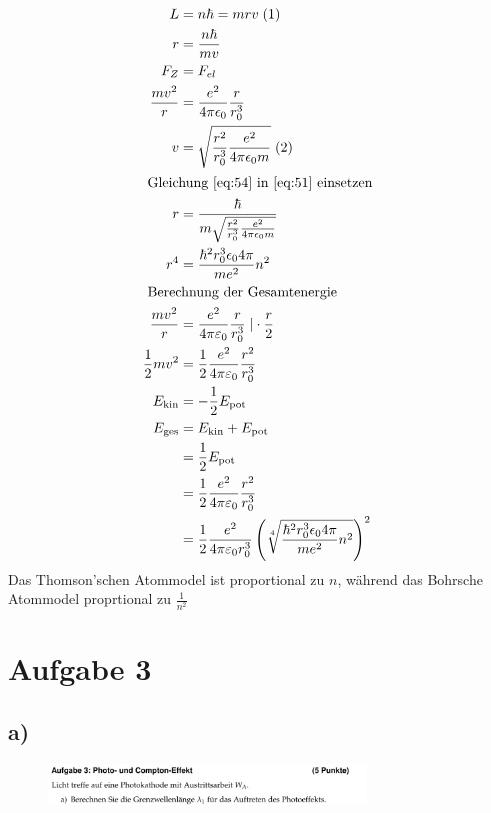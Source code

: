 \begin{align}
    L &= n \hbar = mrv \;(1)\\
    r &= \frac{n \hbar}{mv} \label{eq:51} \\
    F_Z &= F_{el}\\
    \frac{mv^2}{r} &= \frac{e^2}{4 \pi \epsilon _0} \frac{r}{r_0^3}\\
    v &= \sqrt{\frac{r^2}{r_0^3}\frac{e^2}{4 \pi \epsilon _0 m}} \;(2) \label{eq:54}\\
    \intertext{
        Gleichung \eqref{eq:54} in \eqref{eq:51} einsetzen
    }
    r &= \frac{\hbar}{m \sqrt{\frac{r^2}{r_0^3}\frac{e^2}{4 \pi \epsilon _0 m}}}\\
    r^4 &= \frac{\hbar ^2 r_0^3 \epsilon _0 4 \pi}{m e^2} n^2\\
    \intertext{
        Berechnung der Gesamtenergie
        }
    \frac{m v^2}{r} &= \frac{e^2}{4 \pi \varepsilon _0}\frac{r}{r_0^3}\;\vert \cdot \frac{r}{2}\\
    \frac{1}{2} m v^2 &= \frac{1}{2} \frac{e^2}{4 \pi \varepsilon _0} \frac{r^2}{r_0^3}\\
    E_{\text{kin}}&=-\frac{1}{2} E_{\text{pot}}\\
    E_{\text{ges}} &= E_{\text{kin}}+E_{\text{pot}}\\
    &=  \frac{1}{2} E_{\text{pot}}\\
    &= \frac{1}{2} \frac{e^2}{4 \pi \varepsilon _0} \frac{r^2}{r_0^3}\\
    &= \frac{1}{2} \frac{e^2}{4 \pi \varepsilon _0 r_0^3} \left(\sqrt[4]{\frac{\hbar ^2 r_0^3 \epsilon _0 4 \pi}{m e^2} n^2} \right)^2
\end{align}
Das Thomson'schen Atommodel ist proportional zu $n $, während das Bohrsche Atommodel 
proprtional zu $\frac{1}{n^2} $


\section{Aufgabe 3}

\subsection{a)}

\begin{figure}[H]
    \centering
    \includegraphics[width=0.75\textwidth]{images/Aufgabe_3a.jpg}
    \label{fig:8}
\end{figure}

